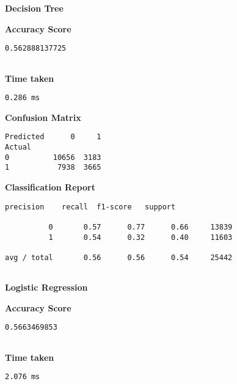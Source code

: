 \documentclass[11pt]{article}
\begin{document}
    \textbf{Decision Tree}

    
    \textbf{Accuracy Score}

    
    \begin{Verbatim}[commandchars=\\\{\}]
0.562888137725


    \end{Verbatim}

    \textbf{Time taken}

    
    \begin{Verbatim}[commandchars=\\\{\}]
0.286 ms

    \end{Verbatim}

    \textbf{Confusion Matrix}

    
    \begin{Verbatim}[commandchars=\\\{\}]
Predicted      0     1
Actual                
0          10656  3183
1           7938  3665

    \end{Verbatim}

    \textbf{Classification Report}

    
    \begin{Verbatim}[commandchars=\\\{\}]
             precision    recall  f1-score   support

          0       0.57      0.77      0.66     13839
          1       0.54      0.32      0.40     11603

avg / total       0.56      0.56      0.54     25442


    \end{Verbatim}

    \textbf{Logistic Regression}

    
    \textbf{Accuracy Score}

    
    \begin{Verbatim}[commandchars=\\\{\}]
0.5663469853


    \end{Verbatim}

    \textbf{Time taken}

    
    \begin{Verbatim}[commandchars=\\\{\}]
2.076 ms

    \end{Verbatim}
\end{document}

